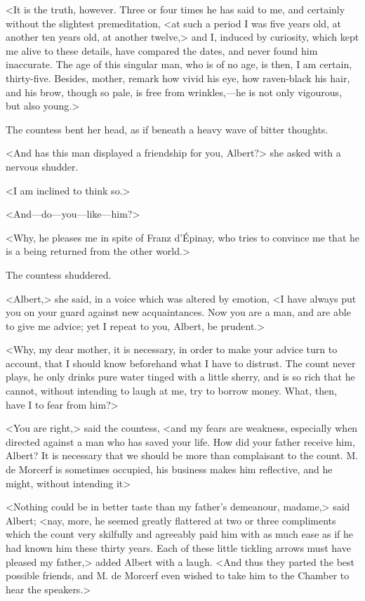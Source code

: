  <It is the truth, however. Three or four times he has said to me, and certainly without the slightest premeditation, <at such a period I was five years old, at another ten years old, at another twelve,> and I, induced by curiosity, which kept me alive to these details, have compared the dates, and never found him inaccurate. The age of this singular man, who is of no age, is then, I am certain, thirty-five. Besides, mother, remark how vivid his eye, how raven-black his hair, and his brow, though so pale, is free from wrinkles,—he is not only vigourous, but also young.> 

 The countess bent her head, as if beneath a heavy wave of bitter thoughts. 

 <And has this man displayed a friendship for you, Albert?> she asked with a nervous shudder. 

 <I am inclined to think so.> 

 <And—do—you—like—him?> 

 <Why, he pleases me in spite of Franz d'Épinay, who tries to convince me that he is a being returned from the other world.> 

 The countess shuddered. 

 <Albert,> she said, in a voice which was altered by emotion, <I have always put you on your guard against new acquaintances. Now you are a man, and are able to give me advice; yet I repeat to you, Albert, be prudent.> 

 <Why, my dear mother, it is necessary, in order to make your advice turn to account, that I should know beforehand what I have to distrust. The count never plays, he only drinks pure water tinged with a little sherry, and is so rich that he cannot, without intending to laugh at me, try to borrow money. What, then, have I to fear from him?> 

 <You are right,> said the countess, <and my fears are weakness, especially when directed against a man who has saved your life. How did your father receive him, Albert? It is necessary that we should be more than complaisant to the count. M. de Morcerf is sometimes occupied, his business makes him reflective, and he might, without intending it\longdash> 

 <Nothing could be in better taste than my father's demeanour, madame,> said Albert; <nay, more, he seemed greatly flattered at two or three compliments which the count very skilfully and agreeably paid him with as much ease as if he had known him these thirty years. Each of these little tickling arrows must have pleased my father,> added Albert with a laugh. <And thus they parted the best possible friends, and M. de Morcerf even wished to take him to the Chamber to hear the speakers.> 

